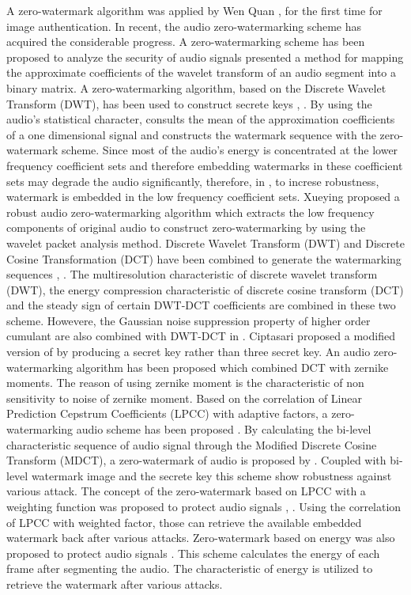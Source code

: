 \documentclass[12pt,a4paper]{report}
\begin{document}
A zero-watermark algorithm was applied by Wen Quan \cite{sun2002zero}, \cite{wen2003concept} for the first time for image authentication. In recent, the audio zero-watermarking scheme has acquired the considerable progress. A zero-watermarking scheme has been proposed to analyze the security of audio signals \cite{zws} presented a method for mapping the approximate coefficients of the wavelet transform of an audio segment into a binary matrix. A zero-watermarking algorithm, based on the Discrete Wavelet Transform (DWT), has been used to construct secrete keys \cite{bzwdwt}, \cite{dwt}. By using the audio's statistical character, \cite{bzwdwt} consults the mean of the approximation coefficients of a one dimensional signal and constructs the watermark sequence with the zero-watermark scheme. Since most of the audio's energy is concentrated at the lower frequency coefficient sets and therefore embedding watermarks in these coefficient sets may degrade the audio significantly, therefore, in \cite{dwt}, to increse robustness, watermark is embedded in the low frequency coefficient sets. Xueying \cite{zhang2014robust} proposed a robust audio zero-watermarking algorithm which extracts the low frequency components of original audio to construct zero-watermarking by using the wavelet packet analysis method. Discrete Wavelet Transform (DWT) and Discrete Cosine Transformation (DCT) have been combined to generate the watermarking sequences \cite{ieee}, \cite{eurasip}. The multiresolution characteristic of discrete wavelet transform (DWT), the energy compression characteristic of discrete cosine transform (DCT) and the steady sign of certain DWT-DCT coefficients are combined in these two scheme. Howevere, the Gaussian noise suppression property of higher order cumulant are also combined with DWT-DCT in \cite{eurasip}. Ciptasari \cite{ciptasari2011efficient} proposed a modified version of \cite{eurasip} by producing a secret key rather than three secret key. An audio zero-watermarking algorithm \cite{zernik} has been proposed which combined DCT with zernike moments. The reason of using zernike moment is the characteristic of non sensitivity to noise of zernike moment. Based on the correlation of Linear Prediction Cepstrum Coefficients (LPCC) with adaptive factors, a zero-watermarking audio scheme has been proposed \cite{yclu}. By calculating the bi-level characteristic sequence of audio signal through the Modified Discrete Cosine Transform (MDCT), a zero-watermark of audio is proposed by \cite{mlwang}. Coupled with bi-level watermark image and the secrete key this scheme show robustness against various attack. The concept of the zero-watermark based on LPCC with a weighting function was proposed to protect audio signals \cite{smtsai}, \cite{lpcc}	. Using the correlation of LPCC with weighted factor, those can retrieve the available embedded watermark back after various attacks. Zero-watermark based on energy was also proposed to protect audio signals \cite{energy}. This scheme calculates the energy of each frame after segmenting the audio. The characteristic of energy is utilized to retrieve the watermark after various attacks.
\end{document}
